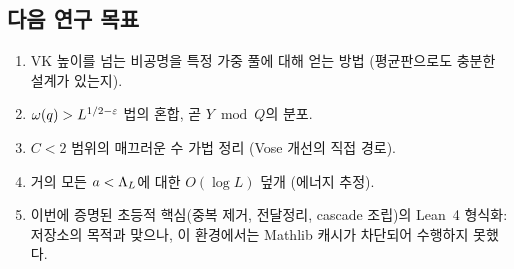\subsection{다음 연구 목표}
\begin{enumerate}[leftmargin=1.6em,itemsep=2pt]
\item VK 높이를 넘는 비공명을 특정 가중 풀에 대해 얻는 방법 (평균판으로도 충분한 설계가 있는지).
\item $\omega(q)>L^{1/2-\varepsilon}$ 법의 혼합, 곧 $Y\bmod Q$의 분포.
\item $C<2$ 범위의 매끄러운 수 가법 정리 (Vose 개선의 직접 경로).
\item 거의 모든 $a<\Lambda_L$에 대한 $O(\log L)$ 덮개 (에너지 추정).
\item 이번에 증명된 초등적 핵심(중복 제거, 전달정리, cascade 조립)의 Lean~4 형식화: 저장소의 목적과 맞으나, 이 환경에서는 Mathlib 캐시가 차단되어 수행하지 못했다.
\end{enumerate}

